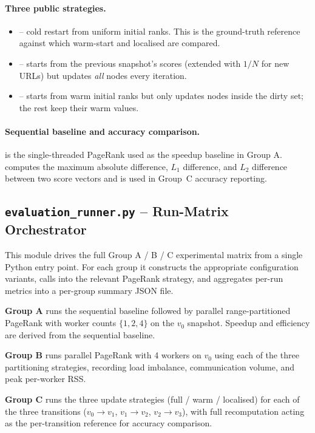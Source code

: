\documentclass[11pt,a4paper]{article}
\begin{document}
\paragraph{Three public strategies.}
\begin{itemize}
    \item {} -- cold restart from
    uniform initial ranks. This is the ground-truth reference against
    which warm-start and localised are compared.
    \item {} -- starts from the previous
    snapshot's scores (extended with $1/N$ for new URLs) but updates
    \emph{all} nodes every iteration.
    \item {} -- starts from warm initial
    ranks but only updates nodes inside the dirty set; the rest keep
    their warm values.
\end{itemize}

\paragraph{Sequential baseline and accuracy comparison.}
 is the single-threaded PageRank used as the
speedup baseline in Group A.  computes
the maximum absolute difference, $L_1$ difference, and $L_2$ difference
between two score vectors and is used in Group~C accuracy reporting.

\subsection{\texttt{evaluation\_runner.py} -- Run-Matrix Orchestrator}
This module drives the full Group A / B / C experimental matrix from a
single Python entry point. For each group it constructs the appropriate
configuration variants, calls into the relevant PageRank strategy, and
aggregates per-run metrics into a per-group summary JSON file.

\textbf{Group A} runs the sequential baseline followed by parallel
range-partitioned PageRank with worker counts $\{1, 2, 4\}$ on the $v_0$
snapshot. Speedup and efficiency are derived from the sequential
baseline.

\textbf{Group B} runs parallel PageRank with 4 workers on $v_0$ using
each of the three partitioning strategies, recording load imbalance,
communication volume, and peak per-worker RSS.

\textbf{Group C} runs the three update strategies (full / warm /
localised) for each of the three transitions ($v_0\to v_1$, $v_1\to v_2$,
$v_2\to v_3$), with full recomputation acting as the per-transition
reference for accuracy comparison.
\end{document}
